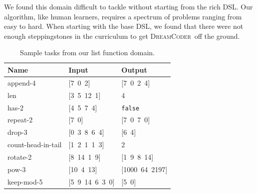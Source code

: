 \documentclass{article}
\newcommand{\system}{\textsc{DreamCoder}~}
\newcommand{\code}[1]{{\footnotesize\texttt{#1}}}
\begin{document}
We found  this domain  difficult to tackle without starting from 
the rich DSL. Our
algorithm, like human learners, requires a spectrum of problems ranging from
easy to hard.
When starting with the base DSL,
we found that there were not enough steppingstones in the curriculum to
get \system off the ground.


\begin{table}
\centering
\begin{tabular}{lll}
  \toprule
  Name & Input & Output \\\midrule
  append-4 & [7\, 0\, 2] & [7\, 0\, 2\, 4] \\
  len & [3\, 5\, 12\, 1] & 4 \\
  has-2 & [4\, 5\, 7\, 4] & \code{false} \\
  repeat-2 & [7\, 0] & [7\, 0\, 7\, 0] \\
  drop-3 & [0\, 3\, 8\, 6\, 4] & [6\, 4] \\
  count-head-in-tail & [1\, 2\, 1\, 1\, 3] & 2 \\
  rotate-2 & [8\, 14\, 1\, 9] & [1\, 9\, 8\, 14] \\
  pow-3 & [10\, 4\, 13] & [1000\, 64\, 2197] \\
  keep-mod-5 & [5\, 9\, 14\, 6\, 3\, 0] & [5\, 0] \\
  \bottomrule
\end{tabular}
\caption{Sample tasks from our list function domain. %
}
\label{listexamples}
\end{table}
\end{document}
